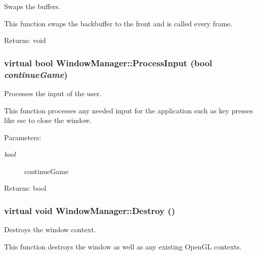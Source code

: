 Swaps the buffers. 

This function swaps the backbuffer to the front and is called every frame.

\begin{Desc}
\item[Returns:]void \end{Desc}
\hypertarget{class_window_manager_78beede37e932a7917c7748659af5973}{
\subsubsection[ProcessInput]{\setlength{\rightskip}{0pt plus 5cm}virtual bool WindowManager::ProcessInput (bool {\em continueGame})}}
\label{class_window_manager_78beede37e932a7917c7748659af5973}


Processes the input of the user. 

This function processes any needed input for the application such as key presses like esc to close the window.

\begin{Desc}
\item[Parameters:]
\begin{description}
\item[{\em bool}]continueGame \end{description}
\end{Desc}
\begin{Desc}
\item[Returns:]bool \end{Desc}
\hypertarget{class_window_manager_fdb17ba07b6589824282386dc8707b79}{
\subsubsection[Destroy]{\setlength{\rightskip}{0pt plus 5cm}virtual void WindowManager::Destroy ()}}
\label{class_window_manager_fdb17ba07b6589824282386dc8707b79}


Destroys the window context. 

This function destroys the window as well as any existing OpenGL contexts.

